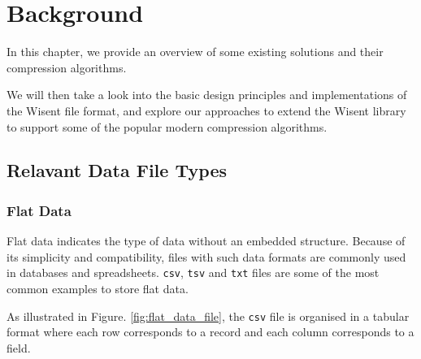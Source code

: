 

\chapter{Background}
\thispagestyle{chapterstyle}

In this chapter, we provide an overview of some existing solutions and their compression algorithms. 

We will then take a look into the basic design principles and implementations of the Wisent file format, and explore our approaches to extend the Wisent library to support some of the popular modern compression algorithms. 

\section{Relavant Data File Types}

\subsection{Flat Data}

Flat data indicates the type of data without an embedded structure. Because of its simplicity and compatibility, files with such data formats are commonly used in databases and spreadsheets. \texttt{csv}, \texttt{tsv} and \texttt{txt} files \cite{csv_format} are some of the most common examples to store flat data. 

As illustrated in Figure. \ref{fig:flat_data_file}, the \texttt{csv} file is organised in a tabular format where each row corresponds to a record and each column corresponds to a field.

